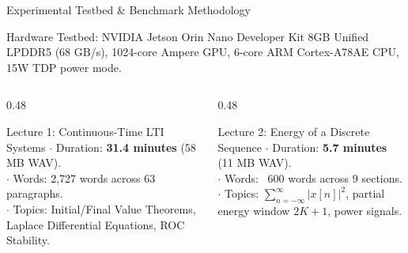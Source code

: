\documentclass[aspectratio=169,10pt]{beamer}
\begin{document}
\begin{frame}{Experimental Testbed \& Benchmark Methodology}
  \begin{block}{Hardware Testbed: NVIDIA Jetson Orin Nano Developer Kit}
    \footnotesize
    8GB Unified LPDDR5 (68 GB/s), 1024-core Ampere GPU, 6-core ARM Cortex-A78AE CPU, 15W TDP power mode.
  \end{block}
  \begin{columns}[T]
    \begin{column}{0.48\textwidth}
      \begin{block}{Lecture 1: Continuous-Time LTI Systems}
        \footnotesize
        $\cdot$ Duration: \textbf{31.4 minutes} (58 MB WAV).\\
        $\cdot$ Words: 2,727 words across 63 paragraphs.\\
        $\cdot$ Topics: Initial/Final Value Theorems, Laplace Differential Equations, ROC Stability.
      \end{block}
    \end{column}
    \begin{column}{0.48\textwidth}
      \begin{block}{Lecture 2: Energy of a Discrete Sequence}
        \footnotesize
        $\cdot$ Duration: \textbf{5.7 minutes} (11 MB WAV).\\
        $\cdot$ Words: ~600 words across 9 sections.\\
        $\cdot$ Topics: $\sum_{n=-\infty}^\infty |x[n]|^2$, partial energy window $2K+1$, power signals.
      \end{block}
    \end{column}
  \end{columns}
\end{frame}
\end{document}
